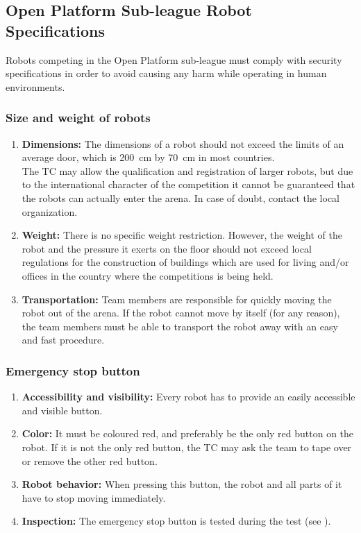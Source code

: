 \subsection{Open Platform Sub-league Robot Specifications}
Robots competing in the Open Platform sub-league must comply with security specifications in order to avoid causing any harm while operating in human environments.

\subsubsection{Size and weight of robots}
\label{rule:robots_size}

\begin{enumerate}
	\item \textbf{Dimensions:} The dimensions of a robot should not exceed the limits of an average door, which is \SI{200}{\centi\meter} by \SI{70}{\centi\meter} in most countries.\\ 
	The TC may allow the qualification and registration of larger robots, but due to the international character of the competition it cannot be guaranteed that the robots can actually enter the arena. In case of doubt, contact the local organization. 
	\item \textbf{Weight:} There is no specific weight restriction. However, the weight of the robot and the pressure it exerts on the floor should not exceed local regulations for the construction of buildings which are used for living and/or offices in the country where the competitions is being held.
	\item \textbf{Transportation:} Team members are responsible for quickly moving the robot out of the arena.	If the robot cannot move by itself (for any reason), the team members must be able to transport the robot away with an easy and fast procedure.
\end{enumerate}

\subsubsection{Emergency stop button}
\label{rule:robots_emergency_button}

\begin{enumerate}
	\item \textbf{Accessibility and visibility:} Every robot has to provide an easily accessible and visible  button. 
	\item \textbf{Color:} It must be coloured red, and preferably be the only red button on the robot. If it is not the only red button, the TC may ask the team to tape over or remove the other red button. 
	\item \textbf{Robot behavior:} When pressing this button, the robot and all parts of it have to stop moving immediately.
	\item \textbf{Inspection:} The emergency stop button is tested during the  test (see ).
\end{enumerate}





